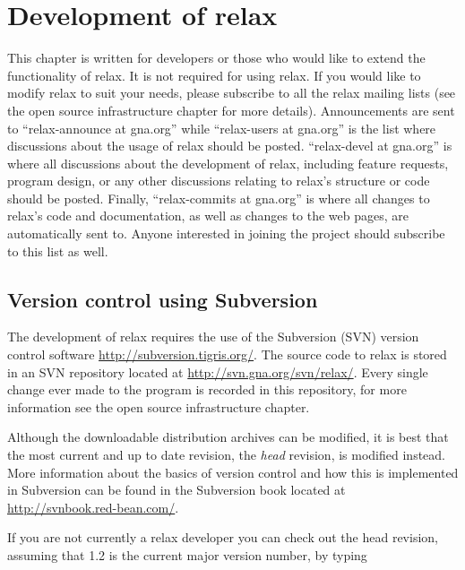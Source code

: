 
\chapter{Development of relax}

This chapter is written for developers or those who would like to extend the functionality of relax.  It is not required for using relax.  If you would like to modify relax to suit your needs, please subscribe to all the relax mailing lists (see the open source infrastructure chapter for more details).  Announcements are sent to ``relax-announce at gna.org'' while ``relax-users at gna.org'' is the list where discussions about the usage of relax should be posted.  ``relax-devel at gna.org'' is where all discussions about the development of relax, including feature requests, program design, or any other discussions relating to relax's structure or code should be posted.  Finally, ``relax-commits at gna.org'' is where all changes to relax's code and documentation, as well as changes to the web pages, are automatically sent to.  Anyone interested in joining the project should subscribe to this list as well.




\section{Version control using Subversion}

The development of relax requires the use of the Subversion (SVN) version control software \href{http://subversion.tigris.org/}{http://subversion.tigris.org/}.  The source code to relax is stored in an SVN repository located at \href{http://svn.gna.org/svn/relax/}{http://svn.gna.org/svn/relax/}.  Every single change ever made to the program is recorded in this repository, for more information see the open source infrastructure chapter.

Although the downloadable distribution archives can be modified, it is best that the most current and up to date revision, the \textit{head} revision, is modified instead.  More information about the basics of version control and how this is implemented in Subversion can be found in the Subversion book located at \href{http://svnbook.red-bean.com/}{http://svnbook.red-bean.com/}.

If you are not currently a relax developer you can check out the head revision, assuming that 1.2 is the current major version number, by typing

